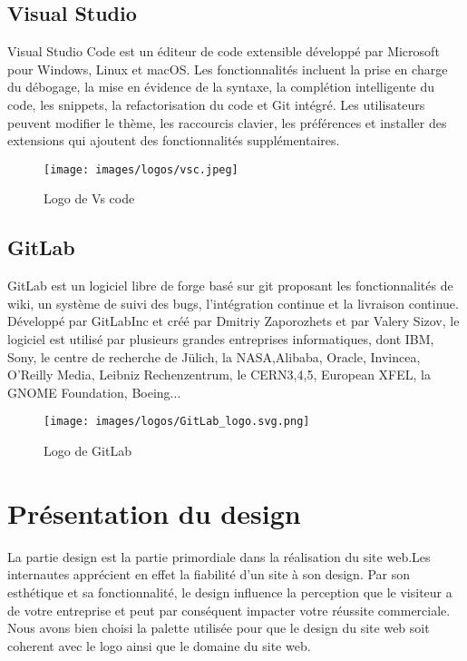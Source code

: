 \subsection{Visual Studio}
Visual Studio Code est un éditeur de code extensible développé par Microsoft pour Windows, Linux et macOS. Les fonctionnalités incluent la prise en charge du débogage, la mise en évidence de la syntaxe, la complétion intelligente du code, les snippets, la refactorisation du code et Git intégré. Les utilisateurs peuvent modifier le thème, les raccourcis clavier, les préférences et installer des extensions qui ajoutent des fonctionnalités supplémentaires. \\
\begin{figure}[!h]  
\begin{center}
\texttt{[image: images/logos/vsc.jpeg]}
\end{center}
\caption{Logo de Vs code}
\end{figure}


\subsection{GitLab}
GitLab est un logiciel libre de forge basé sur git proposant les fonctionnalités de wiki, un
système de suivi des bugs, l’intégration continue et la livraison continue. Développé par GitLabInc et créé par Dmitriy Zaporozhets et par Valery Sizov, le logiciel est utilisé par plusieurs grandes entreprises informatiques, dont IBM, Sony, le centre de recherche de Jülich, la NASA,Alibaba, Oracle, Invincea, O’Reilly Media, Leibniz Rechenzentrum, le CERN3,4,5, European XFEL, la GNOME Foundation, Boeing... \cite{gitLab} \\
\begin{figure}[!h]  
\begin{center}
\texttt{[image: images/logos/GitLab\_logo.svg.png]}
\end{center}
\caption{Logo de GitLab}
\end{figure}

\section{Présentation du design}
La partie design est la partie primordiale dans la réalisation du site web.Les internautes apprécient en effet la fiabilité d'un site à son design. Par son esthétique et sa fonctionnalité, le design influence la perception que le visiteur a de votre entreprise et peut par conséquent impacter votre réussite commerciale.\\
Nous avons bien choisi la palette utilisée pour que le design du site web soit coherent avec le logo ainsi que le domaine du site web.

